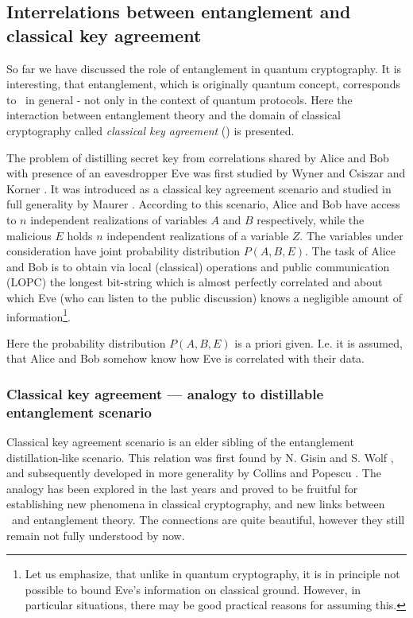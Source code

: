 \documentclass[twocolumn,aps,rmp]{revtex4}
\begin{document}
\subsection{Interrelations between entanglement and classical key agreement}
\label{subsec:inter-ent-CKA}
So far we have discussed the role of entanglement in quantum
cryptography. It is interesting, that entanglement, which is
originally quantum concept, corresponds to \privacy\ in general -
not only in the context of quantum protocols. Here the interaction
between entanglement theory and the domain of classical cryptography
called {\it classical key agreement} (\cka) is presented.

The problem of distilling secret key from correlations shared by
Alice and Bob with presence of an eavesdropper Eve was first studied
by Wyner \cite{Wyner_key_agreement} and Csiszar and Korner
\cite{CsisarKorner_key_agreement}. It was introduced as a classical
key agreement scenario and studied in full generality by Maurer
\cite{Maurer_key_agreement}. According to this scenario, Alice and
Bob have access to $n$ independent realizations of variables $A$ and
$B$ respectively, while the malicious $E$ holds $n$ independent
realizations of a variable $Z$. The variables under consideration
have joint probability distribution $P(A,B,E)$. The task of Alice
and Bob is to obtain via local (classical) operations and public
communication (LOPC) the longest bit-string which is almost
perfectly correlated and about which Eve (who can listen to the
public discussion) knows a negligible amount of
information\footnote{Let us emphasize, that unlike in quantum
cryptography,  it is in principle not possible to bound Eve's
information on classical ground. However, in particular situations,
there may be good practical reasons for assuming this.}.

Here the probability distribution $P(A,B,E)$ is a priori given.
I.e. it is assumed, that Alice and Bob somehow know how Eve is
correlated with their data.

\subsubsection{Classical key agreement --- analogy to distillable entanglement scenario}

Classical key agreement scenario is an elder sibling of the
entanglement distillation-like scenario. This relation was first
found by N. Gisin and S. Wolf
\cite{GisinWolf_QKAvsCKA,GisinWolf_linking}, and subsequently
developed in more generality by Collins and Popescu
\cite{Collins-Popescu}. The analogy has been explored in the last
years and proved to be fruitful for establishing new phenomena in
classical cryptography, and new links between \privacy\ and
entanglement theory. The connections are quite beautiful, however
they still remain not fully understood by now.
\end{document}
